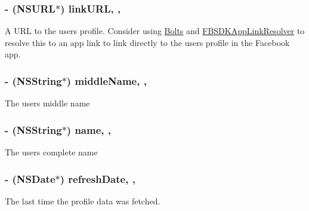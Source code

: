 \subsubsection[{link\+U\+R\+L}]{\setlength{\rightskip}{0pt plus 5cm}-\/ (N\+S\+U\+R\+L$\ast$) link\+U\+R\+L\hspace{0.3cm}{\ttfamily [read]}, {\ttfamily [nonatomic]}, {\ttfamily [assign]}}\label{interface_f_b_s_d_k_profile_ad18140af79f94f03a1317ff4cb1a5b31}
A U\+R\+L to the user\textquotesingle{}s profile.  Consider using \hyperlink{interface_bolts}{Bolts} and {\ttfamily \hyperlink{interface_f_b_s_d_k_app_link_resolver}{F\+B\+S\+D\+K\+App\+Link\+Resolver}} to resolve this to an app link to link directly to the user\textquotesingle{}s profile in the Facebook app. \hypertarget{interface_f_b_s_d_k_profile_a27ffc05364ad2ebef222c9fb97a1369b}{}
\subsubsection[{middle\+Name}]{\setlength{\rightskip}{0pt plus 5cm}-\/ (N\+S\+String$\ast$) middle\+Name\hspace{0.3cm}{\ttfamily [read]}, {\ttfamily [nonatomic]}, {\ttfamily [assign]}}\label{interface_f_b_s_d_k_profile_a27ffc05364ad2ebef222c9fb97a1369b}
The user\textquotesingle{}s middle name \hypertarget{interface_f_b_s_d_k_profile_ac9dc573eea0b89119bc6564618cf959f}{}
\subsubsection[{name}]{\setlength{\rightskip}{0pt plus 5cm}-\/ (N\+S\+String$\ast$) name\hspace{0.3cm}{\ttfamily [read]}, {\ttfamily [nonatomic]}, {\ttfamily [assign]}}\label{interface_f_b_s_d_k_profile_ac9dc573eea0b89119bc6564618cf959f}
The user\textquotesingle{}s complete name \hypertarget{interface_f_b_s_d_k_profile_aef99209a7a849699d65189f37d90cfb7}{}
\subsubsection[{refresh\+Date}]{\setlength{\rightskip}{0pt plus 5cm}-\/ (N\+S\+Date$\ast$) refresh\+Date\hspace{0.3cm}{\ttfamily [read]}, {\ttfamily [nonatomic]}, {\ttfamily [assign]}}\label{interface_f_b_s_d_k_profile_aef99209a7a849699d65189f37d90cfb7}
The last time the profile data was fetched. \hypertarget{interface_f_b_s_d_k_profile_a26a7f698acf093c0d7e2be81532d1d67}{}
